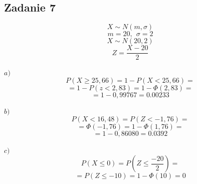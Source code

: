 \subsection{Zadanie 7}

$$ X \sim N ( m, \sigma )$$
$$ m = 20, \ \ \sigma = 2 $$
$$ X \sim N ( 20, 2 )$$
$$ Z = \frac{X - 20}{2} $$  \\

$a)$ 
$$ P( X \ge 25,66 ) = 1 - P( X < 25,66 ) = $$
$$ = 1 - P(z < 2,83) = 1 - \Phi(2,83) = $$
$$ = 1 -  0,99767 = 0.00233$$ \\

$b)$ 
$$ P( X < 16,48 ) =  P( Z < -1,76 ) = $$
$$ = \Phi(-1,76) = 1 - \Phi(1,76) = $$
$$ = 1 -  0,86080 = 0.0392$$ \\

$c)$ 
$$ P( X \le 0 ) =  P( Z \le \frac{-20}{2} ) = $$
$$ = P( Z \le -10) = 1 - \Phi(10) = 0 $$
